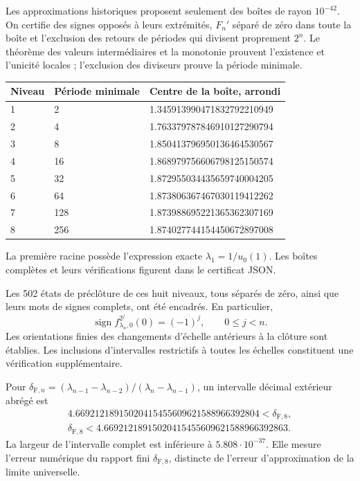 Les approximations historiques proposent seulement des boîtes de rayon \(10^{-42}\). On certifie des signes opposés à leurs extrémités, \(F_n'\) séparé de zéro dans toute la boîte et l’exclusion des retours de périodes qui divisent proprement \(2^n\). Le théorème des valeurs intermédiaires et la monotonie prouvent l’existence et l’unicité locales ; l’exclusion des diviseurs prouve la période minimale.

\begingroup\small
\begin{center}\begin{tabular}{p{.12\linewidth}p{.17\linewidth}p{.62\linewidth}}
\hline
Niveau & Période minimale & Centre de la boîte, arrondi \\
\hline
1 & 2 & 1.345913990471832792210949 \\
2 & 4 & 1.763379787846910127290794 \\
3 & 8 & 1.850413796950136464530567 \\
4 & 16 & 1.868979756606798125150574 \\
5 & 32 & 1.872955034435659740004205 \\
6 & 64 & 1.873806367467030119412262 \\
7 & 128 & 1.873988695221365362307169 \\
8 & 256 & 1.874027744154450672897008 \\
\hline\end{tabular}\end{center}
\endgroup

La première racine possède l’expression exacte \(\lambda_1=1/u_0(1)\). Les boîtes complètes et leurs vérifications figurent dans le certificat JSON.

Les 502 états de préclôture de ces huit niveaux, tous séparés de zéro, ainsi que leurs mots de signes complets, ont été encadrés. En particulier,
\[
\operatorname{sign}f_{\lambda_n,0}^{2^j}(0)=(-1)^j,\qquad0\le j<n.
\]
Les orientations finies des changements d’échelle antérieurs à la clôture sont établies. Les inclusions d’intervalles restrictifs à toutes les échelles constituent une vérification supplémentaire.

Pour \(\delta_{\mathrm F,n}=(\lambda_{n-1}-\lambda_{n-2})/(\lambda_n-\lambda_{n-1})\), un intervalle décimal extérieur abrégé est
\[
\boxed{\begin{gathered}
4.66921218915020415455609621588966392804<\delta_{\mathrm F,8},\\
\delta_{\mathrm F,8}<4.66921218915020415455609621588966392863.
\end{gathered}}
\]
La largeur de l’intervalle complet est inférieure à \(5.808\cdot10^{-37}\). Elle mesure l’erreur numérique du rapport fini \(\delta_{\mathrm F,8}\), distincte de l’erreur d’approximation de la limite universelle.


